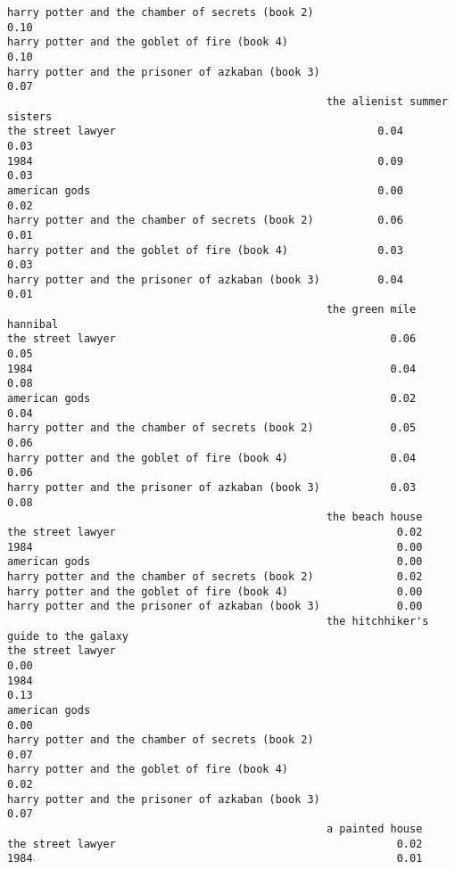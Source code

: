 \documentclass[
]{report}
\begin{document}
\begin{verbatim}
harry potter and the chamber of secrets (book 2)                                             0.10
harry potter and the goblet of fire (book 4)                                                 0.10
harry potter and the prisoner of azkaban (book 3)                                            0.07
                                                  the alienist summer sisters
the street lawyer                                         0.04           0.03
1984                                                      0.09           0.03
american gods                                             0.00           0.02
harry potter and the chamber of secrets (book 2)          0.06           0.01
harry potter and the goblet of fire (book 4)              0.03           0.03
harry potter and the prisoner of azkaban (book 3)         0.04           0.01
                                                  the green mile hannibal
the street lawyer                                           0.06     0.05
1984                                                        0.04     0.08
american gods                                               0.02     0.04
harry potter and the chamber of secrets (book 2)            0.05     0.06
harry potter and the goblet of fire (book 4)                0.04     0.06
harry potter and the prisoner of azkaban (book 3)           0.03     0.08
                                                  the beach house
the street lawyer                                            0.02
1984                                                         0.00
american gods                                                0.00
harry potter and the chamber of secrets (book 2)             0.02
harry potter and the goblet of fire (book 4)                 0.00
harry potter and the prisoner of azkaban (book 3)            0.00
                                                  the hitchhiker's guide to the galaxy
the street lawyer                                                                 0.00
1984                                                                              0.13
american gods                                                                     0.00
harry potter and the chamber of secrets (book 2)                                  0.07
harry potter and the goblet of fire (book 4)                                      0.02
harry potter and the prisoner of azkaban (book 3)                                 0.07
                                                  a painted house
the street lawyer                                            0.02
1984                                                         0.01

\end{verbatim}
\end{document}
